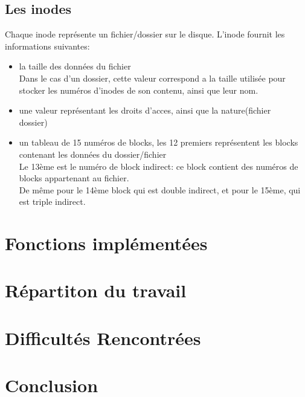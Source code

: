 \documentclass{report}
\begin{document}
\subsection*{Les inodes}
Chaque inode représente un fichier/dossier sur le disque. L'inode fournit les informations suivantes:
\begin{itemize}
    \item la taille des données du fichier\\ Dans le cas d'un dossier, cette valeur correspond a la taille utilisée pour stocker les numéros d'inodes de son contenu, ainsi que leur nom.
    \item une valeur représentant les droits d'acces, ainsi que la nature(fichier\\dossier)
    \item un tableau de 15 numéros de blocks, les 12 premiers représentent les blocks contenant les données du dossier/fichier\\ Le 13ème est le numéro de block indirect: ce block contient des numéros de blocks appartenant au fichier.\\De même pour le 14ème block qui est double indirect, et pour le 15ème, qui est triple indirect.
\end{itemize}


\newpage 





\section*{Fonctions implémentées}


\section*{Répartiton du travail}

\section*{Difficultés Rencontrées}



\section*{Conclusion}
\end{document}
